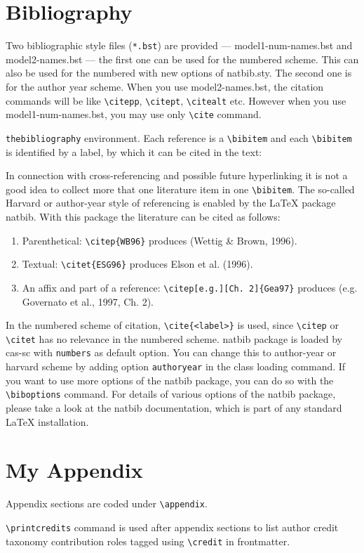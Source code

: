 \documentclass[a4paper,fleqn]{cas-sc}
\begin{document}
\section{Bibliography}

Two bibliographic style files (\verb+*.bst+) are provided ---
{model1-num-names.bst} and {model2-names.bst} --- the first one can be
used for the numbered scheme. This can also be used for the numbered
with new options of {natbib.sty}. The second one is for the author year
scheme. When  you use model2-names.bst, the citation commands will be
like \verb+\citepp+,  \verb+\citept+, \verb+\citealt+ etc. However when
you use model1-num-names.bst, you may use only \verb+\cite+ command.

\verb+thebibliography+ environment.  Each reference is a\linebreak
\verb+\bibitem+ and each \verb+\bibitem+ is identified by a label,
by which it can be cited in the text:

\noindent In connection with cross-referencing and
possible future hyperlinking it is not a good idea to collect
more that one literature item in one \verb+\bibitem+.  The
so-called Harvard or author-year style of referencing is enabled
by the \LaTeX{} package {natbib}. With this package the
literature can be cited as follows:

\begin{enumerate}[\textbullet]
\item Parenthetical: \verb+\citep{WB96}+ produces (Wettig \& Brown, 1996).
\item Textual: \verb+\citet{ESG96}+ produces Elson et al. (1996).
\item An affix and part of a reference:\break
\verb+\citep[e.g.][Ch. 2]{Gea97}+ produces (e.g. Governato et
al., 1997, Ch. 2).
\end{enumerate}

In the numbered scheme of citation, \verb+\cite{<label>}+ is used,
since \verb+\citep+ or \verb+\citet+ has no relevance in the numbered
scheme.  {natbib} package is loaded by {cas-sc} with
\verb+numbers+ as default option.  You can change this to author-year
or harvard scheme by adding option \verb+authoryear+ in the class
loading command.  If you want to use more options of the {natbib}
package, you can do so with the \verb+\biboptions+ command.  For
details of various options of the {natbib} package, please take a
look at the {natbib} documentation, which is part of any standard
\LaTeX{} installation.

\appendix
\section{My Appendix}
Appendix sections are coded under \verb+\appendix+.

\verb+\printcredits+ command is used after appendix sections to list 
author credit taxonomy contribution roles tagged using \verb+\credit+ 
in frontmatter.

\printcredits

% 



\end{document}
